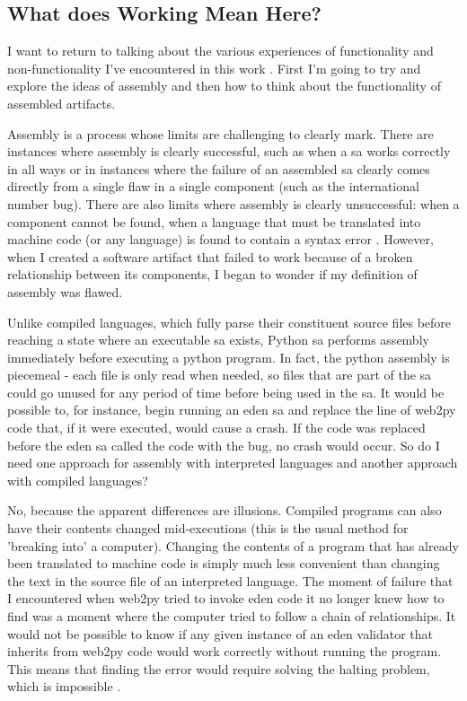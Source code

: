 \documentclass[a4paper,man,natbib,floatsintext]{apa6}
\begin{document}

   \subsection{What does Working Mean Here?}
   I want to return to talking about the various experiences of functionality and non-functionality I've encountered in this work . First I'm going to try and explore the ideas of assembly and then how to think about the functionality of assembled artifacts.

   Assembly is a process whose limits are challenging to clearly mark. There are instances where assembly is clearly successful, such as when a \gls{sa} works correctly in all ways or in instances where the failure of an assembled \gls{sa} clearly comes directly from a single flaw in a single component (such as the international number bug). There are also limits where assembly is clearly unsuccessful: when a component cannot be found, when a language that must be translated into machine code (or any language) is found to contain a syntax error \citep{Cramer2008-cw}. However, when I created a software artifact that failed to work because of a broken relationship between its components, I began to wonder if my definition of assembly was flawed.

   Unlike compiled languages, which fully parse their constituent source files before reaching a state where an executable \gls{sa} exists, Python \gls{sa} performs assembly immediately before executing a python program. In fact, the \gls{python} assembly is piecemeal - each file is only read when needed, so files that are part of the \gls{sa} could go unused for any period of time before being used in the \gls{sa}. It would be possible to, for instance, begin running an \acrshort{eden} \gls{sa} and replace the line of web2py code that, if it were executed, would cause a crash. If the code was replaced before the \acrshort{eden} \gls{sa} called the code with the bug, no crash would occur. So do I need one approach for assembly with interpreted languages and another approach with compiled languages?

   No, because the apparent differences are illusions. Compiled programs can also have their contents changed mid-executions (this is the usual method for 'breaking into' a computer). Changing the contents of a program that has already been translated to machine code is simply much less convenient than changing the text in the source file of an interpreted language. The moment of failure that I encountered when web2py tried to invoke \acrshort{eden} code it no longer knew how to find was a moment where the computer tried to follow a chain of relationships. It would not be possible to know if any given instance of an \acrshort{eden} validator that inherits from web2py code would work correctly without running the program. This means that finding the error would require solving the halting problem, which is impossible \citep{Kaplan_undated-xy}. 
\end{document}
